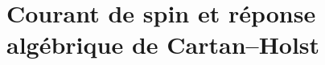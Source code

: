 %

\section{Courant de spin et réponse algébrique de Cartan--Holst}
\label{vii:vii:sec:corriente-respuesta-cartan}

